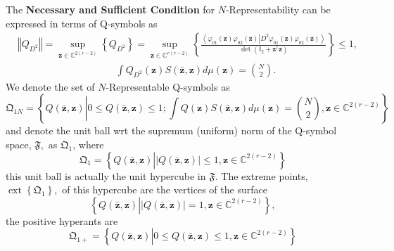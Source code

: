 \documentclass[aps,preprint]{revtex4}%
\begin{document}
The \textbf{Necessary and Sufficient Condition }for $N$-Representability can
be expressed in terms of Q-symbols as
\begin{align}
&  \left\Vert Q_{D^{2}}\right\Vert =\sup_{\mathbf{z\in}\mathbb{C}^{2\left(
r-2\right)  }}\left\{  Q_{D^{2}}\right\}  =\sup_{\mathbf{z\in}\mathbb{C}%
^{r\left(  r-2\right)  }}\left\{  \frac{\left\langle \varphi_{01}\left(
\mathbf{z}\right)  \varphi_{02}\left(  \mathbf{z}\right)  \left\vert
D^{2}\varphi_{01}\left(  \mathbf{z}\right)  \varphi_{02}\left(  \mathbf{z}%
\right)  \right.  \right\rangle }{\det\left(  \mathbb{I}_{2}+\mathbf{z}%
^{\dagger}\mathbf{z}\right)  }\right\}  \leq1,\nonumber\\
&  \qquad\qquad\qquad\qquad\qquad\int Q_{D^{2}}\left(  \mathbf{z}\right)
S\left(  \mathbf{\bar{z},z}\right)  d\mu\left(  \mathbf{z}\right)  =\binom
{N}{2}.
\end{align}
We denote the set of $N$-Representable Q-symbols as
\begin{equation}
\mathfrak{Q}_{1N}=\left\{  Q\left(  \mathbf{\bar{z},z}\right)  \left\vert
0\leq Q\left(  \mathbf{\bar{z},z}\right)  \leq1;\int Q\left(  \mathbf{z}%
\right)  S\left(  \mathbf{\bar{z},z}\right)  d\mu\left(  \mathbf{z}\right)
=\binom{N}{2},\mathbf{z\in}\mathbb{C}^{2\left(  r-2\right)  }\right.
\right\}
\end{equation}
and denote the unit ball wrt the supremum (uniform) norm of the Q-symbol
space, $\mathfrak{F},$ as $\mathfrak{Q}_{1}$, where
\begin{equation}
\mathfrak{Q}_{1}=\left\{  Q\left(  \mathbf{\bar{z},z}\right)  \left\vert
\left\vert Q\left(  \mathbf{\bar{z},z}\right)  \right\vert \leq1,\mathbf{z\in
}\mathbb{C}^{2\left(  r-2\right)  }\right.  \right\}
\end{equation}
this unit ball is actually the unit hypercube in $\mathfrak{F}.$ The extreme
points, $\operatorname*{ext}\left\{  \mathfrak{Q}_{1}\right\}  ,$ of this
hypercube are the vertices of the surface
\begin{equation}
\left\{  Q\left(  \mathbf{\bar{z},z}\right)  \left\vert \left\vert Q\left(
\mathbf{\bar{z},z}\right)  \right\vert =1,\mathbf{z\in}\mathbb{C}^{2\left(
r-2\right)  }\right.  \right\}  ,
\end{equation}
the positive hyperants are
\begin{equation}
\mathfrak{Q}_{1+}=\left\{  Q\left(  \mathbf{\bar{z},z}\right)  \left\vert
0\leq Q\left(  \mathbf{\bar{z},z}\right)  \leq1,\mathbf{z\in}\mathbb{C}%
^{2\left(  r-2\right)  }\right.  \right\}
\end{equation}
\end{document}
